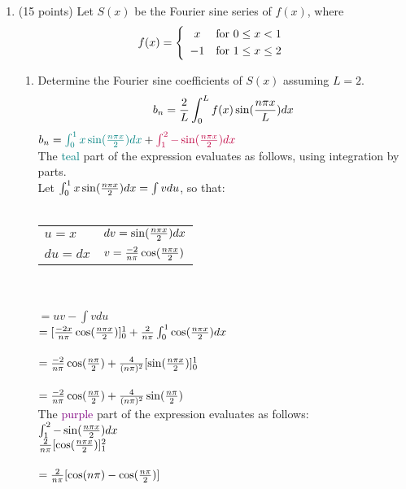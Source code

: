 \documentclass{article}
\begin{document}
\begin{enumerate}

\item (15 points)  Let $S(x)$ be the Fourier sine series of $f(x)$, where
\[
f(x)=\left\{
\begin{array}{cl}
x & \hbox{for $0\le x<1$}\smallskip\\
-1 & \hbox{for $1\le x\le 2$}
\end{array}
\right.
\]
\begin{enumerate}
\item Determine the Fourier sine coefficients of $S(x)$ assuming $L=2$.\\
\[
b_n = {2\over L}\int_{0}^{L}f(x)\sin({n\pi x \over L})dx
\]
$b_n = \textcolor{teal}{\int_{0}^{1}x\sin({n\pi x \over 2})dx}+ \textcolor{purple}{\int_{1}^{2}-\sin({n\pi x \over 2})dx}$\\

The \textcolor{teal}{teal} part of the expression evaluates as follows, using integration by parts.\\
Let $\int_{0}^{1}x\sin({n\pi x \over 2})dx = \int vdu$, so that:\\\\
\begin{tabular}{ l l }
$u=x$ & $dv = \sin({n\pi x \over 2})dx$  \\  
$du=dx$ & $v = {-2 \over n\pi}\cos({n\pi x \over 2})$
\end{tabular}\\\\
$=uv - \int vdu$\\
$=[{-2x\over n\pi}\cos({n\pi x\over 2})]_0^1 + {2\over n\pi}\int_0^1\cos({n\pi x\over 2})dx$\\\\
$={-2\over n\pi}\cos({n\pi \over 2})+ {4\over (n\pi)^2}[\sin({n\pi x\over 2})]_0^1$\\\\
\textcolor{teal}{$={-2\over n\pi}\cos({n\pi \over 2})+ {4\over (n\pi)^2}\sin({n\pi\over 2})$}\\

The \textcolor{purple}{purple} part of the expression evaluates as follows:\\
$\int_{1}^{2}-\sin({n\pi x \over 2})dx$\\
${2 \over n\pi}[\cos({n\pi x \over 2})]_1^2$\\\\
\textcolor{purple}{$={2 \over n\pi}[\cos({n\pi}) - \cos({n\pi \over 2})]$}\\


\end{enumerate}
\end{enumerate}
\end{document}
